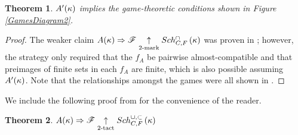 \documentclass{amsart}
\theoremstyle{plain}
\newtheorem{theorem}{Theorem}
\theoremstyle{definition}
\theoremstyle{remark}
\theoremstyle{plain}
\theoremstyle{definition}
\theoremstyle{remark}
\begin{document}

  \begin{theorem}
    \(A'(\kappa)\) implies the game-theoretic conditions
    shown in Figure \ref{GamesDiagram2}.
  \end{theorem}

  \begin{proof}
    The weaker claim
    \(A(\kappa)\Rightarrow\mathscr{F} \underset{2\text{-mark}}{\uparrow}Sch^{\cap}_{C,F}\left({\kappa}\right)\)
    was proven in \cite{clontzMengerGamePreprint};
    however, the strategy
    only required that the \(f_A\) be pairwise almost-compatible and
    that preimages of finite sets in each \(f_A\)
    are finite, which is also possible assuming \(A'(\kappa)\).
    Note that the relationships amongst the games were all shown in
    \cite{clontzMengerGamePreprint}.
  \end{proof}

  We include the following proof from \cite{MR1129143} for the convenience
  of the reader.

  \begin{theorem}
    \(A(\kappa)\Rightarrow\mathscr{F} \underset{2\text{-tact}}{\uparrow}Sch^{\cup,\subset}_{C,F}\left({\kappa}\right)\)
  \end{theorem}
\end{document}
